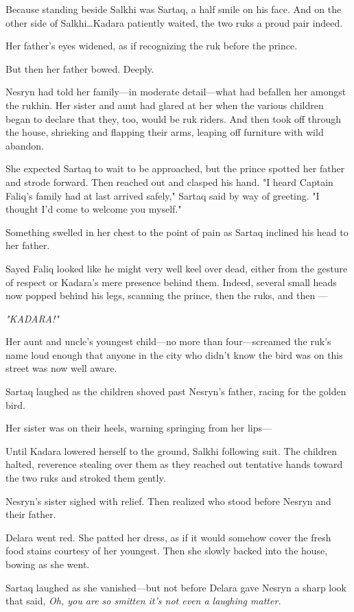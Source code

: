 Because standing beside Salkhi was Sartaq, a half smile on his face.
And on the other side of Salkhi\ldots Kadara patiently waited, the two ruks a proud pair indeed.

Her father's eyes widened, as if recognizing the ruk before the prince.

But then her father bowed.
Deeply.

Nesryn had told her family---in moderate detail---what had befallen her amongst the rukhin.
Her sister and aunt had glared at her when the various children began to declare that they, too, would be ruk riders.
And then took off through the house, shrieking and flapping their arms, leaping off furniture with wild abandon.

She expected Sartaq to wait to be approached, but the prince spotted her father and strode forward.
Then reached out and clasped his hand.
"I heard Captain Faliq's family had at last arrived safely," Sartaq said by way of greeting.
"I thought I'd come to welcome you myself."

Something swelled in her chest to the point of pain as Sartaq inclined his head to her father.

Sayed Faliq looked like he might very well keel over dead, either from the gesture of respect or Kadara's mere presence behind them.
Indeed, several small heads now popped behind his legs, scanning the prince, then the ruks, and then ---

\emph{"KADARA!"}

Her aunt and uncle's youngest child---no more than four---screamed the ruk's name loud enough that anyone in the city who didn't know the bird was on this street was now well aware.

Sartaq laughed as the children shoved past Nesryn's father, racing for the golden bird.

Her sister was on their heels, warning springing from her lips---

Until Kadara lowered herself to the ground, Salkhi following suit.
The children halted, reverence stealing over them as they reached out tentative hands toward the two ruks and stroked them gently.

Nesryn's sister sighed with relief.
Then realized who stood before Nesryn and their father.

Delara went red.
She patted her dress, as if it would somehow cover the fresh food stains courtesy of her youngest.
Then she slowly backed into the house, bowing as she went.

Sartaq laughed as she vanished---but not before Delara gave Nesryn a sharp look that said, \emph{Oh, you are so smitten it's not even a laughing matter.}

